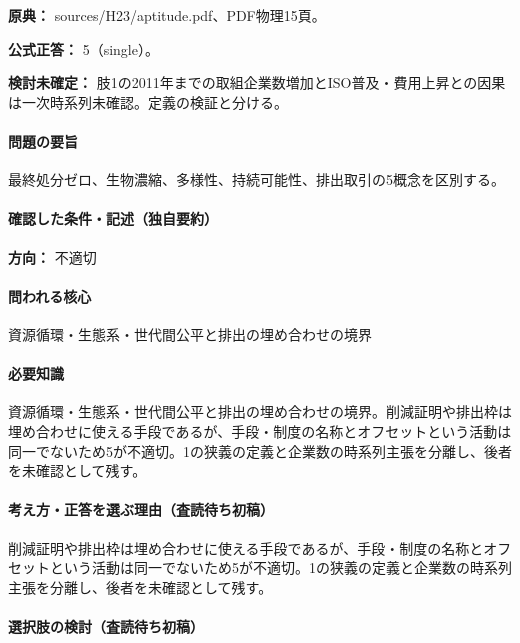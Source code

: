 \noindent\textbf{原典：} sources/H23/aptitude.pdf、PDF物理15頁。

\textbf{公式正答：} 5（single）。

\par\textbf{検討未確定：} 肢1の2011年までの取組企業数増加とISO普及・費用上昇との因果は一次時系列未確認。定義の検証と分ける。

\paragraph{問題の要旨} 最終処分ゼロ、生物濃縮、多様性、持続可能性、排出取引の5概念を区別する。

\paragraph{確認した条件・記述（独自要約）}\mbox{}\par

\noindent\textbf{方向：} 不適切\par

\paragraph{問われる核心} 資源循環・生態系・世代間公平と排出の埋め合わせの境界

\paragraph{必要知識} 資源循環・生態系・世代間公平と排出の埋め合わせの境界。削減証明や排出枠は埋め合わせに使える手段であるが、手段・制度の名称とオフセットという活動は同一でないため5が不適切。1の狭義の定義と企業数の時系列主張を分離し、後者を未確認として残す。

\paragraph{考え方・正答を選ぶ理由（査読待ち初稿）} 削減証明や排出枠は埋め合わせに使える手段であるが、手段・制度の名称とオフセットという活動は同一でないため5が不適切。1の狭義の定義と企業数の時系列主張を分離し、後者を未確認として残す。

\paragraph{選択肢の検討（査読待ち初稿）}\mbox{}\par

